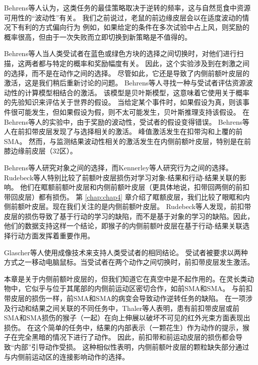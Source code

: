 Behrens等人\cite{behrens2007learning}认为，这类任务的最佳策略取决于逆转的频率，这与自然觅食中资源可用性的“波动性”有关。
我们之前说过，老鼠的前边缘皮层会以在适度波动的情况下有利的方式偏向行为
例如，如果给定的条件在多次试验中占上风，则奖励的概率很高，但由于一次失败而立即切换到新策略是不值得的。\par


Behrens等人当人类受试者在蓝色或绿色方块的选择之间切换时，对他们进行扫描，这两者都与特定的概率和奖励幅度有关。
因此，这个实验涉及到在刺激之间的选择，而不是在动作之间的选择。
尽管如此，它还是导致了内侧前额叶皮层的激活，这是我们稍后重新讨论的问题。
Behrens等人寻找一种与受试者评估资源波动性的计算模型相结合的激活。
该模型是贝叶斯模型，这意味着它使用关于概率的先验知识来评估关于世界的假设。
当给定某个事件时，如果假设为真，则该事件很可能发生，但如果假设为假，则不太可能发生，贝叶斯推理支持该假设。
在Behrens等人的实验中，由于奖励的波动性，受试者的假设变得错误。
Behrens等人在前扣带皮层发现了与选择相关的激活。
峰值激活发生在扣带沟和上覆的前SMA。
然而，与监测结果波动性相关的激活发生在内侧前额叶皮层，特别是在前膝边缘前皮层（32区）。\par


Behrens等人研究对象之间的选择，而Kennerley等人研究行为之间的选择。
Rudebeck等人\cite{rudebeck2008frontal}特别比较了前额叶皮层损伤对学习对象-结果和行动-结果关联的影响。
他们在眶额前额叶皮层和内侧前额叶皮层（更具体地说，扣带回两侧的前扣带回皮层）都有损伤。
第 \ref{chap:chap4} 章介绍了眶额皮层，我们比较了眼眶和内侧前额叶皮层。现在我们关注的是内侧前额叶皮层。
Rudebeck等人发现，前扣带皮层的损伤导致了基于行动的学习的缺陷，而不是基于对象的学习的缺陷。因此，他们的数据支持这样一个结论，即猴子的内侧前额叶皮层在基于行动-结果关联选择行动方面发挥着重要作用。\par
Glascher等人\cite{glascher2009determining}使用成像技术来支持人类受试者的相同结论。
受试者被要求以两种方式之一移动电脑鼠标。当受试者在两个动作之间切换时，前扣带皮层发生激活。\par
本章是关于内侧前额叶皮层的，但我们知道它在真空中是不起作用的。在灵长类动物中，它似乎与位于其尾部的内侧前运动区密切合作，如前SMA和SMA。
与前扣带皮层的损伤一样\cite{kennerley2006optimal}，前SMA和SMA的病变会导致动作逆转任务的缺陷\cite{chen1995functions}。
在一项涉及行动和结果之间关联的不同任务中，Thaler等人\cite{thaler1995functions}表明，患有前扣带皮层或前SMA和SMA损伤的猴子（一起）在向上伸展以破坏不可见的红外光束方面表现出损伤。
在这个简单的任务中，结果的内部表示（一颗花生）作为动作的提示，猴子在完全黑暗的情况下进行了动作。
因此，前扣带和前运动皮层的损伤都会导致“内部”引导动作受损。
这种相似性表明，内侧前额叶皮层的颗粒缺失部分通过与内侧前运动区的连接影响动作的选择。\par



